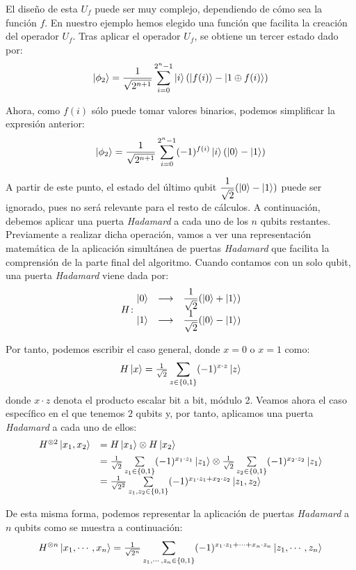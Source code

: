 El diseño de esta $U_f$ puede ser muy complejo, dependiendo de cómo sea la función $f$. En nuestro ejemplo hemos elegido una función que facilita la creación del operador $U_f$.
%
Tras aplicar el operador $U_f$, se obtiene un tercer estado dado por:
$$\left|\phi_2\right\rangle = \dfrac{1}{\sqrt{2^{n+1}}} \sum\limits_{i=0}^{2^n - 1} \left|i\right\rangle(\left|f(i)\right\rangle-\left|1\oplus f(i)\right\rangle) 
$$

Ahora, como $f(i)$ sólo puede tomar valores binarios, podemos simplificar la expresión anterior:
\begin{equation}
\left|\phi_2\right\rangle = \dfrac{1}{\sqrt{2^{n+1}}} \sum\limits_{i=0}^{2^n - 1} (-1)^{f(i)}\left|i\right\rangle(\left|0\right\rangle-\left|1\right\rangle) 
\label{phi2}
\end{equation}

A partir de este punto, el estado del último qubit $\dfrac{1}{\sqrt{2}}(\left|0\right\rangle-\left|1\right\rangle)$ puede ser ignorado, pues no será relevante para el resto de cálculos.
%
A continuación, debemos aplicar una puerta \textit{Hadamard} a cada uno de los $n$ qubits restantes. Previamente a realizar dicha operación, vamos a ver una representación matemática de la aplicación simultánea de puertas \textit{Hadamard} que facilita la comprensión de la parte final del algoritmo.
%
Cuando contamos con un solo qubit, una puerta \textit{Hadamard} viene dada por: \[H\colon \begin{matrix}\left|0\right\rangle&\longrightarrow& \dfrac{1}{\sqrt{2}}(\left|0\right\rangle+\left|1\right\rangle)\\ \left|1\right\rangle&\longrightarrow& \dfrac{1}{\sqrt{2}}(\left|0\right\rangle-\left|1\right\rangle)\end{matrix}\]

Por tanto, podemos escribir el caso general, donde $x=0$ o $x=1$ como:
$$H\left|x\right\rangle = \tfrac{1}{\sqrt{2}}\sum\limits_{z\in\{0,1\}} (-1)^{x\cdot z}\left|z\right\rangle
$$
donde $x\cdot z$ denota el producto escalar bit a bit, módulo 2. 
%
Veamos ahora el caso específico en el que tenemos $2$ qubits y, por tanto,  aplicamos una puerta \textit{Hadamard} a cada uno de ellos:
%
$$\begin{array}{ll}
H^{\otimes 2}\left|x_1,x_2\right\rangle & = H\left|x_1\right\rangle \otimes H\left|x_2\right\rangle \\[0.5em]
& = \tfrac{1}{\sqrt{2}}\sum\limits_{z_1\in\{0,1\}} (-1)^{x_1\cdot z_1}\left|z_1\right\rangle \otimes \tfrac{1}{\sqrt{2}}\sum\limits_{z_2\in\{0,1\}} (-1)^{x_2\cdot z_2}\left|z_1\right\rangle \\[0.5em]
& = \tfrac{1}{\sqrt{2^2}}\sum\limits_{z_1,z_2\in\{0,1\}} (-1)^{x_1\cdot z_1+x_2\cdot z_2}\left|z_1,z_2\right\rangle
\end{array}
$$

De esta misma forma, podemos representar la aplicación de puertas  \textit{Hadamard} a $n$ qubits como se muestra a continuación:
$$
H^{\otimes n}\left|x_1,\cdots,x_n\right\rangle  = \tfrac{1}{\sqrt{2^n}}\sum\limits_{z_1,\cdots,z_n\in\{0,1\}} (-1)^{x_1\cdot z_1+\cdots+x_n\cdot z_n}\left|z_1,\cdots,z_n\right\rangle
$$

